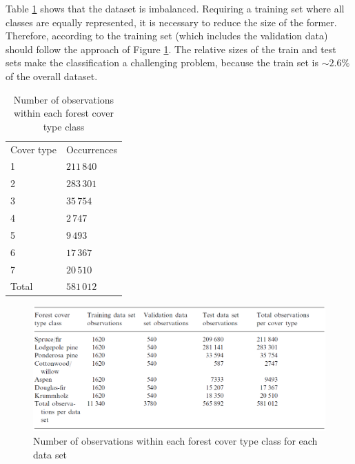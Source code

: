 Table \ref{tab:covertypes} shows that the dataset is imbalanced. Requiring a training set where all classes are equally represented, it is necessary to reduce the size of the former. Therefore, according to \cite{blackardDean} the training set (which includes the validation data) should follow the approach of Figure \ref{fig:covertypesdims}. The relative sizes of the train and test sets make the classification a challenging problem, because the train set is $\sim2.6\%$ of the overall dataset.
\begin{table}[]
	\centering
	\begin{tabular}{ll}
		Cover type & Occurrences \\
		1          & $211\,840$  \\
		2          & $283\,301$  \\
		3          & $35\,754$   \\
		4          & $2\,747$    \\
		5          & $9\,493$    \\
		6          & $17\,367$   \\
		7          & $20\,510$   \\
		Total      & $581\,012$     
	\end{tabular}
	\caption{Number of observations within each forest cover type class}
	\label{tab:covertypes}
\end{table}
\begin{figure}
	\centering
	\includegraphics[width=\textwidth]{./TeX_files/img/covertypetable.png}
	\caption{Number of observations within each forest cover type class for each data set}
	\label{fig:covertypesdims}
\end{figure}

